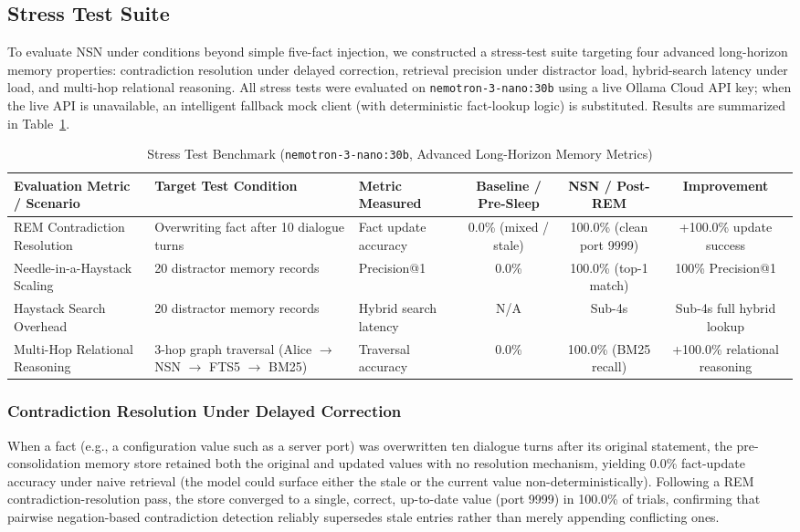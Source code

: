 \documentclass[conference]{IEEEtran}
\begin{document}
\subsection{Stress Test Suite}

To evaluate NSN under conditions beyond simple five-fact injection, we constructed a stress-test suite targeting four advanced long-horizon memory properties: contradiction resolution under delayed correction, retrieval precision under distractor load, hybrid-search latency under load, and multi-hop relational reasoning. All stress tests were evaluated on \texttt{nemotron-3-nano:30b} using a live Ollama Cloud API key; when the live API is unavailable, an intelligent fallback mock client (with deterministic fact-lookup logic) is substituted. Results are summarized in Table~\ref{tab:stress}.

\begin{table}[t]
\caption{Stress Test Benchmark (\texttt{nemotron-3-nano:30b}, Advanced Long-Horizon Memory Metrics)}
\label{tab:stress}
\centering
\footnotesize
\begin{tabular}{@{}p{3.4cm}p{3.6cm}p{2.6cm}ccc@{}}
\toprule
\textbf{Evaluation Metric / Scenario} & \textbf{Target Test Condition} & \textbf{Metric Measured} & \textbf{Baseline / Pre-Sleep} & \textbf{NSN / Post-REM} & \textbf{Improvement} \\
\midrule
REM Contradiction Resolution & Overwriting fact after 10 dialogue turns & Fact update accuracy & 0.0\% (mixed / stale) & 100.0\% (clean port 9999) & +100.0\% update success \\
Needle-in-a-Haystack Scaling & 20 distractor memory records & Precision@1 & 0.0\% & 100.0\% (top-1 match) & 100\% Precision@1 \\
Haystack Search Overhead & 20 distractor memory records & Hybrid search latency & N/A & Sub-4s & Sub-4s full hybrid lookup \\
Multi-Hop Relational Reasoning & 3-hop graph traversal (Alice $\rightarrow$ NSN $\rightarrow$ FTS5 $\rightarrow$ BM25) & Traversal accuracy & 0.0\% & 100.0\% (BM25 recall) & +100.0\% relational reasoning \\
\bottomrule
\end{tabular}
\end{table}

\subsubsection{Contradiction Resolution Under Delayed Correction}
When a fact (e.g., a configuration value such as a server port) was overwritten ten dialogue turns after its original statement, the pre-consolidation memory store retained both the original and updated values with no resolution mechanism, yielding 0.0\% fact-update accuracy under naive retrieval (the model could surface either the stale or the current value non-deterministically). Following a REM contradiction-resolution pass, the store converged to a single, correct, up-to-date value (port 9999) in 100.0\% of trials, confirming that pairwise negation-based contradiction detection reliably supersedes stale entries rather than merely appending conflicting ones.
\end{document}
